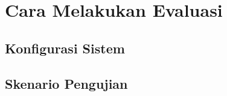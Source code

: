 \section{Cara Melakukan Evaluasi}
\label{sec:cara-melakukan-evaluasi}

\subsection{Konfigurasi Sistem}
\label{sec:konfigurasi-sistem}
    
\subsection{Skenario Pengujian}
\label{sec:skenario-pengujian}